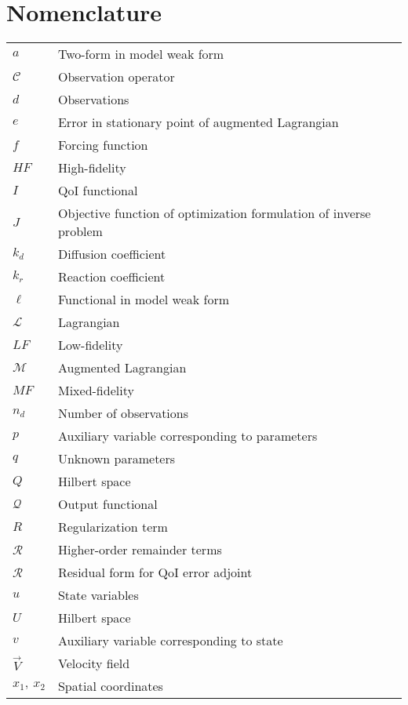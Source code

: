 \clearpage
\section*{\huge{Nomenclature}}

\begin{longtable}{ p{}  p{} }
$a$							& 	Two-form in model weak form\\
$\mathcal{C}$		&		Observation operator \\
$d$							&		Observations \\
$e$							&		Error in stationary point of augmented Lagrangian \\
$f$							&		Forcing function \\
$HF$						&		High-fidelity \\
$I$							&		QoI functional \\
$J$							&		Objective function of optimization formulation of inverse problem \\
$k_d$						&		Diffusion coefficient \\
$k_r$						&		Reaction coefficient \\
$\ell$					&		Functional in model weak form \\
$\mathcal{L}$		&		Lagrangian \\
$LF$						&		Low-fidelity \\
$\mathcal{M}$		&		Augmented Lagrangian \\
$MF$						&		Mixed-fidelity \\
$n_d$						&		Number of observations \\
$p$							&		Auxiliary variable corresponding to parameters \\
$q$   					&   Unknown parameters \\
$Q$							&		Hilbert space \\
$\mathcal{Q}$		&		Output functional \\
$R$							&		Regularization term \\
$\mathcal{R}$		&		Higher-order remainder terms \\
$\mathscr{R}$		&		Residual form for QoI error adjoint \\
$u$   					&   State variables \\
$U$							&		Hilbert space \\
$v$							&		Auxiliary variable corresponding to state \\
$\vec{V}$				&		Velocity field \\
$x_1,\:x_2$			&		Spatial coordinates \\

\end{longtable}
